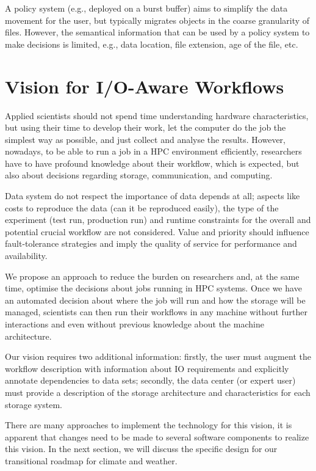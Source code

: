 \documentclass[a4paper]{article}
\newcommand{\jk}[1]{\todo[inline]{JK: #1}}
\begin{document}
A policy system (e.g., deployed on a burst buffer) aims to simplify the data movement for the user, but typically migrates objects in the coarse granularity of files.
However, the semantical information that can be used by a policy system to make decisions is limited, e.g., data location, file extension, age of the file, etc.

\jk{TODO}


\section{Vision for I/O-Aware Workflows}

Applied scientists should not spend time understanding hardware characteristics, but using their time to develop their work, let the computer do the job the simplest way as possible, and just collect and analyse the results.
However, nowadays, to be able to run a job in a HPC environment efficiently, researchers have to have profound knowledge about their workflow, which is expected, but also about decisions regarding storage, communication, and computing.

Data system do not respect the importance of data depends at all; aspects like costs to reproduce the data (can it be reproduced easily), the type of the experiment (test run, production run) and runtime constraints for the overall and potential crucial workflow are not considered.
Value and priority should influence fault-tolerance strategies and imply the quality of service for performance and availability.

We propose an approach to reduce the burden on researchers and, at the same time, optimise the decisions about jobs running in HPC systems.
Once we have an automated decision about where the job will run and how the storage will be managed, scientists can then run their workflows in any machine without further interactions and even without previous knowledge about the machine architecture.

Our vision requires two additional information: firstly, the user must augment the workflow description with information about IO requirements and explicitly annotate dependencies to data sets; secondly, the data center (or expert user) must provide a description of the storage architecture and characteristics for each storage system.

There are many approaches to implement the technology for this vision, it is apparent that changes need to be made to several software components to realize this vision.
In the next section, we will discuss the specific design for our transitional roadmap for climate and weather.
\end{document}
